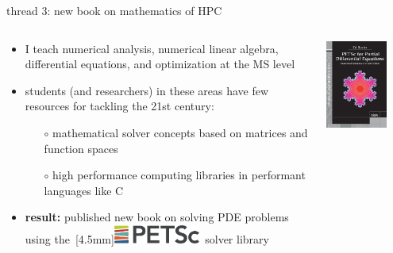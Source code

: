 \documentclass[svgnames,
               hyperref={colorlinks,citecolor=DeepPink4,linkcolor=FireBrick,urlcolor=Maroon},
               usepdftitle=false]  %
               {beamer}
\begin{document}
\begin{frame}{thread 3: new book on mathematics of HPC}

\begin{columns}
\begin{column}{0.6\textwidth}
\begin{itemize}
\item I teach numerical analysis, numerical linear algebra, differential equations, and optimization at the MS level
\item students (and researchers) in these areas have few resources for tackling the 21st century:
    \begin{itemize}
    \item[$\circ$] {\color{FireBrick} mathematical solver concepts} based on matrices and function spaces
    \item[$\circ$] {\color{FireBrick} high performance computing libraries} in performant languages like C
    \end{itemize}
\item \textbf{result:} published {\color{FireBrick} new book} on solving PDE problems using the \,\raisebox{-3pt}[4.5mm]{\href{https://petsc.org/release/}{\includegraphics[width=0.3\textwidth]{figs/petsc.png}}}\, solver library
\end{itemize}
\end{column}
\begin{column}{0.4\textwidth}
\hfill \href{https://epubs.siam.org/doi/book/10.1137/1.9781611976311}{\includegraphics[width=0.75\textwidth]{figs/frontcover.jpg}}


\end{column}
\end{columns}
\end{frame}
\end{document}
